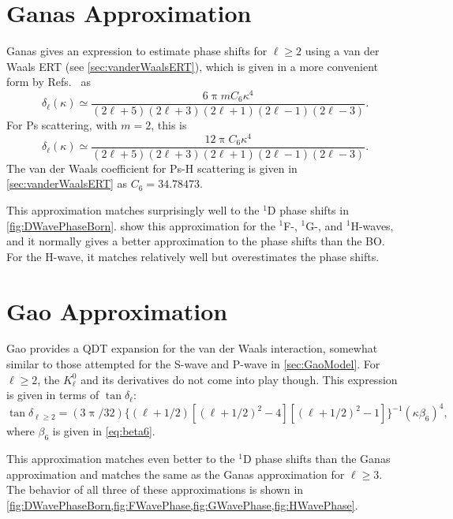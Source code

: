 \documentclass[Dissertation.tex]{subfiles}
\begin{document}


\section{Ganas Approximation}
\label{sec:GanasPhase}

Ganas \cite{Ganas1972} gives an expression to estimate phase shifts for
$\ell \geq 2$ using a van der Waals ERT (see \cref{sec:vanderWaalsERT}),
which is given in a more convenient form by
Refs.~\cite{Fabrikant2014a,Mitroy2003a,Swann2015} as
\begin{equation}
\label{eq:vdWPhase}
\delta_\ell(\kappa) \simeq \frac{6 \uppi m C_6 \kappa^4}{(2\ell+5)(2\ell+3)(2\ell+1)(2\ell-1)(2\ell-3)}.
\end{equation}
For Ps scattering, with $m = 2$, this is
\begin{equation}
\label{eq:vdWPhase}
\delta_\ell(\kappa) \simeq \frac{12 \uppi C_6 \kappa^4}{(2\ell+5)(2\ell+3)(2\ell+1)(2\ell-1)(2\ell-3)}.
\end{equation}
The van der Waals coefficient for Ps-H scattering is given in
\cref{sec:vanderWaalsERT} as $C_6 = 34.78473$.

This approximation matches surprisingly well to the $^1$D phase shifts in
\cref{fig:DWavePhaseBorn}. 
show this approximation for the $^1$F-, $^1$G-, and $^1$H-waves, and it normally
gives a better approximation to the phase shifts than the BO. For the H-wave,
it matches relatively well but overestimates the phase shifts.


\section{Gao Approximation}
\label{sec:GaoPhase}

Gao \cite{Gao1998a} provides a QDT expansion for the van der Waals interaction,
somewhat similar to those attempted for the S-wave and P-wave in
\cref{sec:GaoModel}. For $\ell \geq 2$, the $K_\ell^0$ and its derivatives
do not come into play though. This expression is given in terms of $\tan\delta_\ell$:
\begin{equation}
\label{eq:GaoPhase}
\tan\delta_{\ell \geq 2} = (3 \uppi / 32) \{(\ell+1/2) [(\ell+1/2)^2 - 4][(\ell+1/2)^2 - 1]\}^{-1} (\kappa \beta_6)^4,
\end{equation}
where $\beta_6$ is given in \cref{eq:beta6}.

This approximation matches even better to the $^1$D phase shifts than the Ganas
approximation and matches the same as the Ganas approximation for $\ell \geq 3$.
The behavior of all three of these approximations is shown in
\cref{fig:DWavePhaseBorn,fig:FWavePhase,fig:GWavePhase,fig:HWavePhase}.
\end{document}
